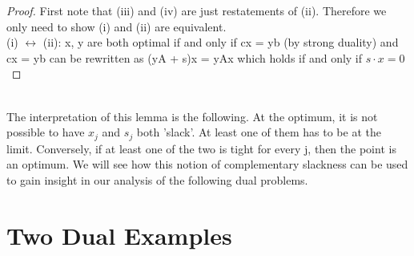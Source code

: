 \documentclass{article}
\begin{document}
\begin{proof}
First note that (iii) and (iv) are just restatements of (ii).  Therefore we only need to show (i) and (ii) are equivalent.\\
(i) $\leftrightarrow$ (ii):  x, y are both optimal if and only if cx = yb (by strong duality) and cx = yb can be rewritten as (yA + s)x = yAx which holds if and only if $s \cdot x = 0$\\
\end{proof}\\
The interpretation of this lemma is the following.  At the optimum, it is not possible to have $x_j$ and $s_j$ both 'slack'.  At least one of them has to be at the limit.  Conversely, if at least one of the two is tight for every j, then the point is an optimum.  We will see how this notion of complementary slackness can be used to gain insight in our analysis of the following dual problems.\\

\section{Two Dual Examples}
\end{document}
